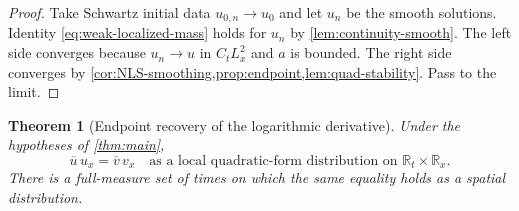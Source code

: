 \documentclass[11pt,oneside]{book}
\newtheorem{theorem}{Theorem}[chapter]
\theoremstyle{definition}
\theoremstyle{remark}
\newcommand{\R}{\mathbb R}
\newcommand{\1}{\mathbf 1}
\begin{document}
\begin{proof}
Take Schwartz initial data $u_{0,n}\to u_0$ and let $u_n$ be the smooth
solutions.  Identity \eqref{eq:weak-localized-mass} holds for $u_n$ by
\cref{lem:continuity-smooth}.  The left side converges because
$u_n\to u$ in $C_tL^2_x$ and $a$ is bounded.  The right side converges by
\cref{cor:NLS-smoothing,prop:endpoint,lem:quad-stability}.  Pass to the limit.
\end{proof}

\begin{theorem}[Endpoint recovery of the logarithmic derivative]
\label{thm:current-recovery}
Under the hypotheses of \cref{thm:main},
\begin{equation}
 \overline u\,u_x=\overline v\,v_x
 \quad\text{as a local quadratic-form distribution on }\R_t\times\R_x.
 \label{eq:log-derivative-equality}
\end{equation}
There is a full-measure set of times on which the same equality holds as a
spatial distribution.
\end{theorem}
\end{document}
